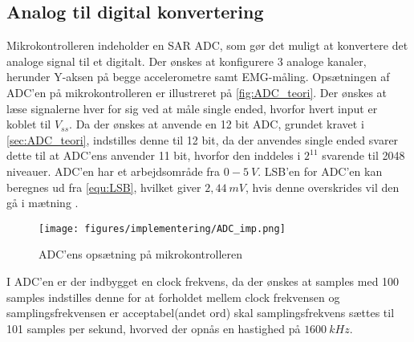 \subsection{Analog til digital konvertering}
Mikrokontrolleren indeholder en SAR ADC, som gør det muligt at konvertere det analoge signal til et digitalt. Der ønskes at konfigurere 3 analoge kanaler, herunder Y-aksen på begge accelerometre samt EMG-måling. Opsætningen af ADC'en på mikrokontrolleren er illustreret på \autoref{fig:ADC_teori}. Der ønskes at læse signalerne hver for sig ved at måle single ended, hvorfor hvert input er koblet til $V_{ss}$.  Da der ønskes at anvende en 12 bit ADC, grundet kravet i \autoref{sec:ADC_teori}, indstilles denne til 12 bit, da der anvendes single ended svarer dette til at ADC'ens anvender 11 bit, hvorfor den inddeles i $2^{11}$ svarende til 2048 niveauer. ADC'en har et arbejdsområde fra $0-5~V$. LSB'en for ADC'en kan beregnes ud fra \autoref{equ:LSB}, hvilket giver $2,44~mV$, hvis denne overskrides vil den gå i mætning \citep{ADC2014}. 
\begin{figure}[H]
\centering
\texttt{[image: figures/implementering/ADC\_imp.png]}
\caption{ADC'ens opsætning på mikrokontrolleren}
\label{fig:ADC_teori}
\end{figure}

I ADC'en er der indbygget en clock frekvens, da der ønskes at samples med 100 samples indstilles denne for at forholdet mellem clock frekvensen og samplingsfrekvensen er acceptabel(andet ord) skal samplingsfrekvens sættes til 101 samples per sekund, hvorved der opnås en hastighed på $1600~kHz$. 
